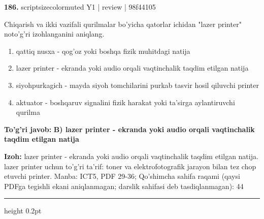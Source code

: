 \documentclass[10pt,a4paper]{article}
\begin{document}
{\bfseries\sffamily\color{ink} 186.} {scriptsizecolor{muted} Y1 | review | 98f44105}
\par
Chiqarish va ikki vazifali qurilmalar bo'yicha qatorlar ichidan "lazer printer" noto'g'ri izohlanganini aniqlang.
\begin{enumerate}[label=\Alph*),leftmargin=9mm]
\item qattiq nusxa - qog'oz yoki boshqa fizik muhitdagi natija
\item lazer printer - ekranda yoki audio orqali vaqtinchalik taqdim etilgan natija
\item siyohpurkagich - mayda siyoh tomchilarini purkab tasvir hosil qiluvchi printer
\item aktuator - boshqaruv signalini fizik harakat yoki ta'sirga aylantiruvchi qurilma
\end{enumerate}
\begin{tcolorbox}[enhanced,breakable,colback=teal!4,colframe=teal!60!black,boxrule=0.45pt,arc=1.2mm,left=2.7mm,right=2.7mm,top=1.8mm,bottom=1.8mm,before skip=2mm,after skip=2mm]
{\bfseries\sffamily\color{teal}To'g'ri javob:} \textbf{B) lazer printer - ekranda yoki audio orqali vaqtinchalik taqdim etilgan natija}
\par\smallskip
{\bfseries Izoh:} lazer printer - ekranda yoki audio orqali vaqtinchalik taqdim etilgan natija. lazer printer uchun to'g'ri ta'rif: toner va elektrofotografik jarayon bilan tez chop etuvchi printer. Manba: ICT5, PDF 29-36; Qo'shimcha sahifa raqami (qaysi PDFga tegishli ekani aniqlanmagan; darslik sahifasi deb tasdiqlanmagan): 44
\end{tcolorbox}
\vspace{2mm}\hrule height 0.2pt\vspace{3mm}
\end{document}
